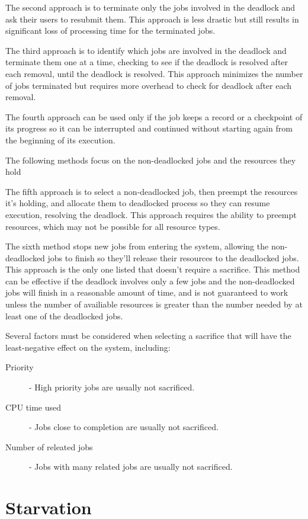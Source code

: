 \documentclass[12pt letter]{report}
\begin{document}
The second approach is to terminate only the jobs involved in the
deadlock and ask their users to resubmit them. This approach is less drastic but
still results in significant loss of processing time for the
terminated jobs.

The third approach is to identify which jobs are involved in the
deadlock and terminate them one at a time, checking to see if the
deadlock is resolved after each removal, until the deadlock is
resolved. This approach minimizes the number of jobs terminated but
requires more overhead to check for deadlock after each removal.

The fourth approach can be used only if the job keeps a record or a
checkpoint of its progress so it can be interrupted and continued
without starting again from the beginning of its execution.

The following methods focus on the non-deadlocked jobs and the
resources they hold

The fifth approach is to select a non-deadlocked job, then preempt
the resources it's holding, and allocate them to deadlocked process
so they can resume execution, resolving the deadlock. This
approach requires the ability to preempt resources, which may not be
possible for all resource types.

The sixth method stops new jobs from entering the system, allowing
the non-deadlocked jobs to finish so they'll release their resources
to the deadlocked jobs. This approach is the only one listed that
doesn't require a sacrifice. This method can be effective if the
deadlock involves only a few jobs and the non-deadlocked jobs will
finish in a reasonable amount of time, and is not guaranteed to work
unless the number of availiable resources is greater than the number
needed by at least one of the deadlocked jobs.

Several factors must be considered when selecting a sacrifice that
will have the least-negative effect on the system, including:
\begin{description}
  \item[Priority]  - High priority jobs are usually not sacrificed.
  \item[CPU time used] - Jobs close to completion are usually not sacrificed.
  \item[Number of releated jobs] - Jobs with many related jobs are
    usually not sacrificed.
\end{description}

\section{Starvation}
\end{document}

